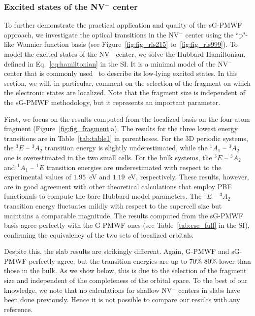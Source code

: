\documentclass[journal=jacsat,manuscript=article]{achemso}
\begin{document}
\subsubsection{Excited states of the NV$^-$ center}
To further demonstrate the practical application and quality of the sG-PMWF approach, we investigate the optical transitions in the NV$^-$ center using the ``p"-like Wannier function basis (see Figure~\ref{fig:fig_rls215} to~\ref{fig:fig_rls999}). To model the excited states of the NV$^-$ center, we solve the Hubbard Hamiltonian, defined in Eq.~\eqref{eq:hamiltonian} in the SI. It is a minimal model of the NV$^-$ center that is commonly used~\cite{choi2012mechanism,bockstedte2018ab,ma2020quantum,ma2021quantum} to describe its low-lying excited states. In this section, we will, in particular, comment on the selection of the fragment on which the electronic states are localized. Note that the fragment size is independent of the sG-PMWF methodology, but it represents an important parameter. 

First, we focus on the results computed from the localized basis on the four-atom fragment (Figure~\ref{fig:fig_fragment}a). The results for the three lowest energy transitions are in Table~\ref{tab:table1} in parentheses. For the 3D periodic systems, the $^3E$ -- $^3A_2$ transition energy is slightly underestimated, while the $^1A_1$ -- $^3A_2$ one is overestimated in the two small cells. For the bulk systems, the $^3E$ -- $^3A_2$ and $^1A_1$ -- $^1E$ transition energies are underestimated with respect to the experimental values of $1.95$~eV and $1.19$~eV, respectively. These results, however, are in good agreement with other theoretical calculations that employ PBE functionals to compute the bare Hubbard model parameters\cite{Goss1996,Gali2008,Delaney2010,Ma2010,Gordon2013,Alkauskas2014a}. The $^1E$ -- $^3A_2$ transition energy fluctuates mildly with respect to the supercell size but maintains a comparable magnitude. The results computed from the sG-PMWF basis agree perfectly with the G-PMWF ones (see Table~\ref{tab:ese_full} in the SI), confirming the equivalency of the two sets of localized orbitals. 

Despite this, the slab results are strikingly different. Again, G-PMWF and sG-PMWF perfectly agree, but the transition energies are up to 70\%-80\% lower than those in the bulk. As we show below, this is due to the selection of the fragment size and independent of the completeness of the orbital space. To the best of our knowledge, we note that no calculations for shallow NV$^-$ centers in slabs have been done previously. Hence it is not possible to compare our results with any reference.
\end{document}

